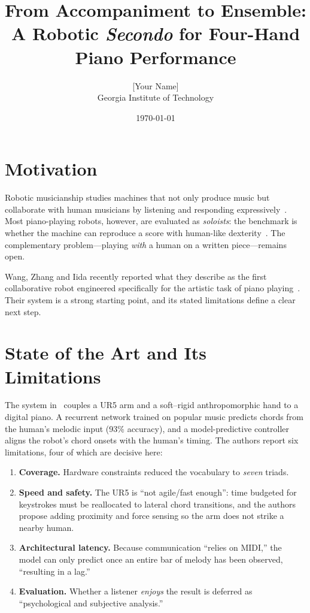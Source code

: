 \documentclass[11pt]{article}
\title{\vspace{-1.5em}\textbf{From Accompaniment to Ensemble:\\
A Robotic \emph{Secondo} for Four-Hand Piano Performance}\vspace{-0.5em}}
\author{[Your Name] \\ \small Georgia Institute of Technology}
\date{\vspace{-0.8em}\small\today\vspace{-1em}}
\begin{document}
\maketitle

\section{Motivation}
Robotic musicianship studies machines that not only produce music but collaborate with
human musicians by listening and responding expressively~\cite{weinberg2020robotic,hoffman2011interactive}.
Most piano-playing robots, however, are evaluated as \emph{soloists}: the benchmark is whether
the machine can reproduce a score with human-like dexterity~\cite{zakka2023robopianist}.
The complementary problem---playing \emph{with} a human on a written piece---remains open.

Wang, Zhang and Iida recently reported what they describe as the first collaborative robot
engineered specifically for the artistic task of piano playing~\cite{wang2024cooperative}.
Their system is a strong starting point, and its stated limitations define a clear next step.

\section{State of the Art and Its Limitations}
The system in~\cite{wang2024cooperative} couples a UR5 arm and a soft--rigid anthropomorphic hand
to a digital piano. A recurrent network trained on popular music predicts chords from the human's
melodic input (93\% accuracy), and a model-predictive controller aligns the robot's chord onsets
with the human's timing. The authors report six limitations, four of which are decisive here:

\begin{enumerate}[label=(L\arabic*)]
  \item \textbf{Coverage.} Hardware constraints reduced the vocabulary to \emph{seven} triads.
  \item \textbf{Speed and safety.} The UR5 is ``not agile/fast enough'': time budgeted for
        keystrokes must be reallocated to lateral chord transitions, and the authors propose adding
        proximity and force sensing so the arm does not strike a nearby human.
  \item \textbf{Architectural latency.} Because communication ``relies on MIDI,'' the model can only
        predict once an entire bar of melody has been observed, ``resulting in a lag.''
  \item \textbf{Evaluation.} Whether a listener \emph{enjoys} the result is deferred as
        ``psychological and subjective analysis.''
\end{enumerate}
\end{document}
